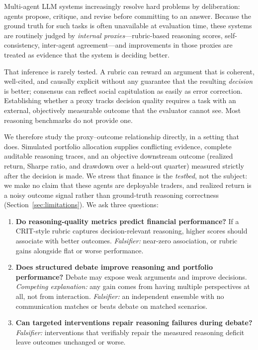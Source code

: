 \documentclass{article}
\begin{document}
Multi-agent LLM systems increasingly resolve hard problems by deliberation: agents
propose, critique, and revise before committing to an answer. Because the ground
truth for such tasks is often unavailable at evaluation time, these systems are
routinely judged by \emph{internal proxies}---rubric-based reasoning scores,
self-consistency, inter-agent agreement---and improvements in those proxies are
treated as evidence that the system is deciding better.

That inference is rarely tested. A rubric can reward an argument that is coherent,
well-cited, and causally explicit without any guarantee that the resulting
\emph{decision} is better; consensus can reflect social capitulation as easily as
error correction. Establishing whether a proxy tracks decision quality requires a
task with an external, objectively measurable outcome that the evaluator cannot see.
Most reasoning benchmarks do not provide one.

We therefore study the proxy--outcome relationship directly, in a setting that does.
Simulated portfolio allocation supplies conflicting evidence, complete auditable
reasoning traces, and an objective downstream outcome (realized return, Sharpe ratio, and drawdown over a held-out quarter) measured strictly after the decision is made. We stress that finance is the \emph{testbed}, not the subject: we
make no claim that these agents are deployable traders, and realized return is a
noisy outcome signal rather than ground-truth reasoning correctness
(Section~\ref{sec:limitations}). We ask three questions:

\vspace{-4pt}
\begin{enumerate}[label=\textbf{RQ\arabic*.},leftmargin=2.6em,itemsep=1pt,topsep=2pt]
    \item \label{RQ1} \textbf{Do reasoning-quality metrics predict financial
    performance?} If a CRIT-style rubric captures decision-relevant reasoning,
    higher scores should associate with better outcomes. \emph{Falsifier:} near-zero
    association, or rubric gains alongside flat or worse performance.
    \item \label{RQ2} \textbf{Does structured debate improve reasoning and portfolio
    performance?} Debate may expose weak arguments and improve decisions.
    \emph{Competing explanation:} any gain comes from having multiple perspectives at
    all, not from interaction. \emph{Falsifier:} an independent ensemble with no
    communication matches or beats debate on matched scenarios.
    \item \label{RQ3} \textbf{Can targeted interventions repair reasoning failures
    during debate?} \emph{Falsifier:} interventions that verifiably repair the
    measured reasoning deficit leave outcomes unchanged or worse.
\end{enumerate}
\vspace{-4pt}
\end{document}
